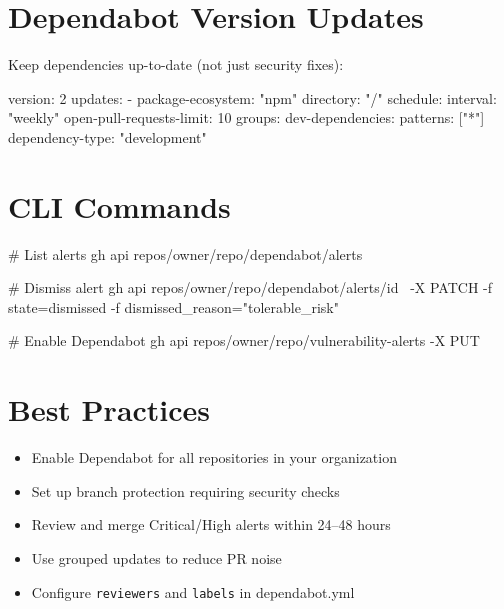 \documentclass[10pt,letterpaper]{article}
\begin{document}
\section{Dependabot Version Updates}

Keep dependencies up-to-date (not just security fixes):

\begin{yamlcode}
version: 2
updates:
  - package-ecosystem: "npm"
    directory: "/"
    schedule:
      interval: "weekly"
    open-pull-requests-limit: 10
    groups:
      dev-dependencies:
        patterns: ["*"]
        dependency-type: "development"
\end{yamlcode}

\section{CLI Commands}

\begin{bashcode}
# List alerts
gh api repos/{owner}/{repo}/dependabot/alerts

# Dismiss alert
gh api repos/{owner}/{repo}/dependabot/alerts/{id} \
  -X PATCH -f state=dismissed -f dismissed_reason="tolerable_risk"

# Enable Dependabot
gh api repos/{owner}/{repo}/vulnerability-alerts -X PUT
\end{bashcode}

\section{Best Practices}

\begin{itemize}
  \item Enable Dependabot for all repositories in your organization
  \item Set up branch protection requiring security checks
  \item Review and merge Critical/High alerts within 24--48 hours
  \item Use grouped updates to reduce PR noise
  \item Configure \texttt{reviewers} and \texttt{labels} in dependabot.yml
\end{itemize}
\end{document}
